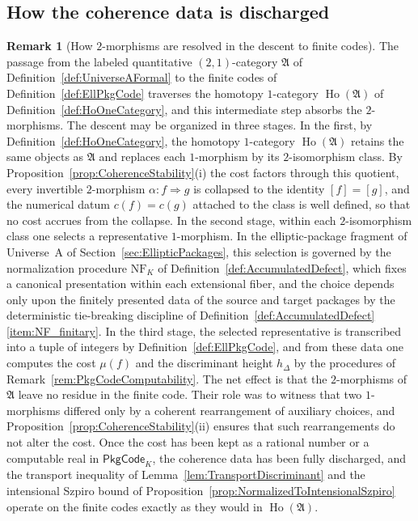 \documentclass[10pt, reqno]{amsart}
\theoremstyle{plain}
\theoremstyle{definition}
\newtheorem{remark}[theorem]{Remark}
\theoremstyle{plain}
\newcommand{\Ho}{\operatorname{Ho}}
\begin{document}
\subsection{How the coherence data is discharged}\label{subsec:TwoMorphismErasure}

\begin{remark}[How $2$-morphisms are resolved in the descent to finite codes]\label{rem:TwoMorphismErasure}
The passage from the labeled quantitative $(2,1)$-category $\mathfrak{A}$ of Definition~\ref{def:UniverseAFormal} to the finite codes of Definition~\ref{def:EllPkgCode} traverses the homotopy $1$-category $\Ho(\mathfrak{A})$ of Definition~\ref{def:HoOneCategory}, and this intermediate step absorbs the $2$-morphisms. The descent may be organized in three stages. In the first, by Definition~\ref{def:HoOneCategory}, the homotopy $1$-category $\Ho(\mathfrak{A})$ retains the same objects as $\mathfrak{A}$ and replaces each $1$-morphism by its $2$-isomorphism class. By Proposition~\ref{prop:CoherenceStability}\textup{(i)} the cost factors through this quotient, every invertible $2$-morphism $\alpha \colon f \Rightarrow g$ is collapsed to the identity $[f] = [g]$, and the numerical datum $c(f) = c(g)$ attached to the class is well defined, so that no cost accrues from the collapse. In the second stage, within each $2$-isomorphism class one selects a representative $1$-morphism. In the elliptic-package fragment of Universe~A of Section~\ref{sec:EllipticPackages}, this selection is governed by the normalization procedure $\mathrm{NF}_K$ of Definition~\ref{def:AccumulatedDefect}, which fixes a canonical presentation within each extensional fiber, and the choice depends only upon the finitely presented data of the source and target packages by the deterministic tie-breaking discipline of Definition~\ref{def:AccumulatedDefect}\textup{\ref{item:NF_finitary}}. In the third stage, the selected representative is transcribed into a tuple of integers by Definition~\ref{def:EllPkgCode}, and from these data one computes the cost $\mu(f)$ and the discriminant height $h_\Delta$ by the procedures of Remark~\ref{rem:PkgCodeComputability}. The net effect is that the $2$-morphisms of $\mathfrak{A}$ leave no residue in the finite code. Their role was to witness that two $1$-morphisms differed only by a coherent rearrangement of auxiliary choices, and Proposition~\ref{prop:CoherenceStability}\textup{(ii)} ensures that such rearrangements do not alter the cost. Once the cost has been kept as a rational number or a computable real in $\mathsf{PkgCode}_K$, the coherence data has been fully discharged, and the transport inequality of Lemma~\ref{lem:TransportDiscriminant} and the intensional Szpiro bound of Proposition~\ref{prop:NormalizedToIntensionalSzpiro} operate on the finite codes exactly as they would in $\Ho(\mathfrak{A})$.
\end{remark}
\end{document}
